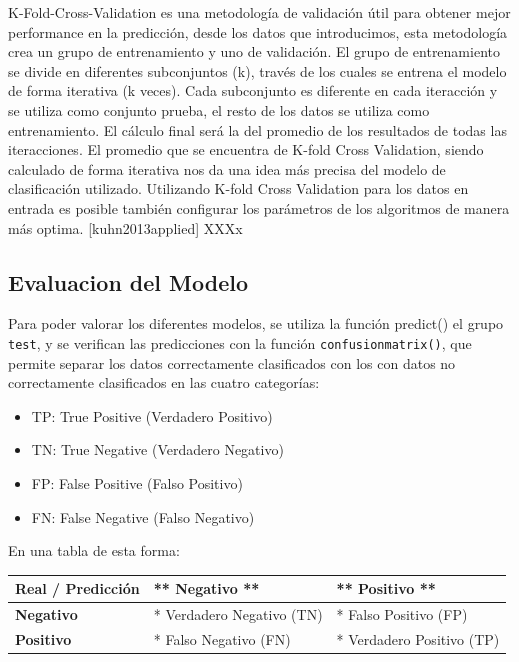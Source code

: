 \documentclass[
]{article}
\begin{document}
K-Fold-Cross-Validation es una metodología de validación útil para
obtener mejor performance en la predicción, desde los datos que
introducimos, esta metodología crea un grupo de entrenamiento y uno de
validación. El grupo de entrenamiento se divide en diferentes
subconjuntos (k), través de los cuales se entrena el modelo de forma
iterativa (k veces). Cada subconjunto es diferente en cada iteracción y
se utiliza como conjunto prueba, el resto de los datos se utiliza como
entrenamiento. El cálculo final será la del promedio de los resultados
de todas las iteracciones. El promedio que se encuentra de K-fold Cross
Validation, siendo calculado de forma iterativa nos da una idea más
precisa del modelo de clasificación utilizado. Utilizando K-fold Cross
Validation para los datos en entrada es posible también configurar los
parámetros de los algoritmos de manera más optima. {[}kuhn2013applied{]}
XXXx

\hypertarget{evaluacion-del-modelo}{%
\subsection{Evaluacion del Modelo}\label{evaluacion-del-modelo}}

Para poder valorar los diferentes modelos, se utiliza la función
predict() el grupo \texttt{test}, y se verifican las predicciones con la
función \texttt{confusionmatrix()}, que permite separar los datos
correctamente clasificados con los con datos no correctamente
clasificados en las cuatro categorías:

\begin{itemize}
\item
  TP: True Positive (Verdadero Positivo)
\item
  TN: True Negative (Verdadero Negativo)
\item
  FP: False Positive (Falso Positivo)
\item
  FN: False Negative (Falso Negativo)
\end{itemize}

En una tabla de esta forma:

\begin{longtable}[]{@{}lll@{}}
\toprule()
Real / Predicción & ** Negativo ** & ** Positivo ** \\
\midrule()
\endhead
\textbf{Negativo} & * Verdadero Negativo (TN) & * Falso Positivo (FP) \\
\textbf{Positivo} & * Falso Negativo (FN) & * Verdadero Positivo (TP) \\
\bottomrule()
\end{longtable}
\end{document}
